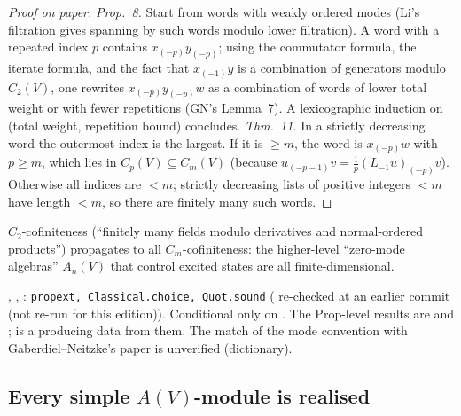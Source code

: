 \begin{proof}[Proof on paper]
\emph{Prop.~8.} Start from words with weakly ordered modes (Li's filtration gives spanning by such words modulo lower
filtration). A word with a repeated index $p$ contains $x_{(-p)}y_{(-p)}$; using the commutator formula, the iterate
formula, and the fact that $x_{(-1)}y$ is a combination of generators modulo $C_2(V)$, one rewrites
$x_{(-p)}y_{(-p)}w$ as a combination of words of lower total weight or with fewer repetitions (GN's Lemma~7). A
lexicographic induction on (total weight, repetition bound) concludes. \emph{Thm.~11.} In a strictly decreasing word the
outermost index is the largest. If it is $\ge m$, the word is $x_{(-p)}w$ with $p\ge m$, which lies in $C_p(V)\subseteq
C_m(V)$ (because $u_{(-p-1)}v=\frac1p(L_{-1}u)_{(-p)}v$). Otherwise all indices are $<m$; strictly decreasing lists of
positive integers $<m$ have length $<m$, so there are finitely many such words.
\end{proof}

\begin{physics}
$C_2$-cofiniteness (``finitely many fields modulo derivatives and normal-ordered products'') propagates to all
$C_m$-cofiniteness: the higher-level ``zero-mode algebras'' $A_n(V)$ that control excited states are all finite-dimensional.
\end{physics}

\begin{status}
, \allowbreak{}\allowbreak{}, \allowbreak{}:
\texttt{propext, Classical.choice, Quot.sound} (\allowbreak{}\allowbreak{}
re-checked at an earlier commit (not re-run for this edition)). Conditional only on . The Prop-level results are
\allowbreak{}\allowbreak{} and ;
\allowbreak{} is a  producing data from them. The match of the mode
convention with Gaberdiel--Neitzke's paper is unverified (dictionary).
\end{status}

\subsection{Every simple \texorpdfstring{$A(V)$}{A(V)}-module is realised}

